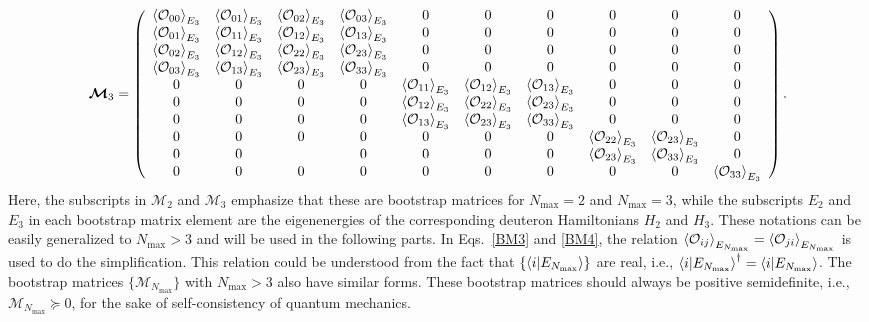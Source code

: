 \documentclass[aps,prc,reprint,superscriptaddress,nofootinbib]{revtex4-2}
\begin{document}
\begin{widetext}
\begin{align}
\bm{\mathcal{M}}_3=\left(
\begin{array}{cccccccccc}
\braket{\mathcal{O}_{00}}_{E_3} & \braket{\mathcal{O}_{01}}_{E_3} & \braket{\mathcal{O}_{02}}_{E_3} & \braket{\mathcal{O}_{03}}_{E_3} & 0 & 0 & 0 & 0 & 0 & 0 \\
\braket{\mathcal{O}_{01}}_{E_3} & \braket{\mathcal{O}_{11}}_{E_3} & \braket{\mathcal{O}_{12}}_{E_3} & \braket{\mathcal{O}_{13}}_{E_3} & 0 & 0 & 0 & 0 & 0 & 0 \\
\braket{\mathcal{O}_{02}}_{E_3} & \braket{\mathcal{O}_{12}}_{E_3} & \braket{\mathcal{O}_{22}}_{E_3} & \braket{\mathcal{O}_{23}}_{E_3} & 0 & 0 & 0 & 0 & 0 & 0  \\
\braket{\mathcal{O}_{03}}_{E_3} & \braket{\mathcal{O}_{13}}_{E_3} & \braket{\mathcal{O}_{23}}_{E_3} & \braket{\mathcal{O}_{33}}_{E_3} & 0 & 0 & 0 & 0 & 0 & 0  \\
0 & 0 & 0 & 0 & \braket{\mathcal{O}_{11}}_{E_3} & \braket{\mathcal{O}_{12}}_{E_3} & \braket{\mathcal{O}_{13}}_{E_3} & 0 & 0 & 0 \\
0 & 0 & 0 & 0 & \braket{\mathcal{O}_{12}}_{E_3} & \braket{\mathcal{O}_{22}}_{E_3} & \braket{\mathcal{O}_{23}}_{E_3} & 0 & 0 & 0 \\
0 & 0 & 0 & 0 & \braket{\mathcal{O}_{13}}_{E_3} & \braket{\mathcal{O}_{23}}_{E_3} & \braket{\mathcal{O}_{33}}_{E_3} & 0 & 0 & 0 \\
0 & 0 & 0 & 0 & 0 & 0 & 0 & \braket{\mathcal{O}_{22}}_{E_3} & \braket{\mathcal{O}_{23}}_{E_3} & 0 \\
0 & 0 & & 0 & 0 & 0 & 0 & \braket{\mathcal{O}_{23}}_{E_3} & \braket{\mathcal{O}_{33}}_{E_3} & 0 \\
0 & 0 & 0 & 0 & 0 & 0 & 0 & 0 & 0 &  \braket{\mathcal{O}_{33}}_{E_3}
\end{array}
\right).
\label{BM4}
\end{align}
 Here, the subscripts in $\bm{\mathcal{M}}_2$ and $\bm{\mathcal{M}}_3$
emphasize that these are bootstrap matrices for $N_\text{max}=2$ and $N_\text{max}=3$,
while the subscripts $E_{2}$ and $E_3$ in each bootstrap matrix element are the eigenenergies of the corresponding deuteron Hamiltonians $H_{2}$ and $H_3$.
These notations can be easily generalized to $N_\text{max}>3$ and will be used in the following parts.
In Eqs.~\eqref{BM3} and \eqref{BM4},
the relation $\braket{\mathcal{O}_{ij}}_{E_{N_\text{max}}}=\braket{\mathcal{O}_{ji}}_{E_{N_\text{max}}}$ is used to do the simplification.
This relation could be understood from the fact that $\{\braket{i|E_{N_\text{max}}}\}$ are real,
i.e., $\braket{i|E_{N_\text{max}}}^\dagger=\braket{i|E_{N_\text{max}}}$.
The bootstrap matrices $\{\bm{\mathcal{M}}_{N_\text{max}}\}$ with $N_\text{max}>3$ also have similar forms.
These bootstrap matrices should always be positive semidefinite, i.e., $\bm{\mathcal{M}}_{N_\text{max}}\succeq0$, for the sake of self-consistency of quantum mechanics.
 

\end{widetext}
\end{document}
